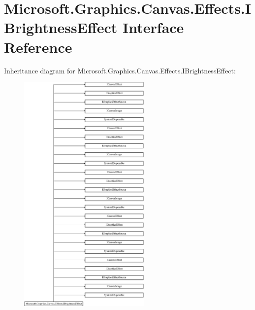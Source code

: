 \hypertarget{interface_microsoft_1_1_graphics_1_1_canvas_1_1_effects_1_1_i_brightness_effect}{}\section{Microsoft.\+Graphics.\+Canvas.\+Effects.\+I\+Brightness\+Effect Interface Reference}
\label{interface_microsoft_1_1_graphics_1_1_canvas_1_1_effects_1_1_i_brightness_effect}
Inheritance diagram for Microsoft.\+Graphics.\+Canvas.\+Effects.\+I\+Brightness\+Effect\+:\begin{figure}[H]
\begin{center}
\leavevmode
\includegraphics[height=12.000000cm]{interface_microsoft_1_1_graphics_1_1_canvas_1_1_effects_1_1_i_brightness_effect}
\end{center}
\end{figure}
